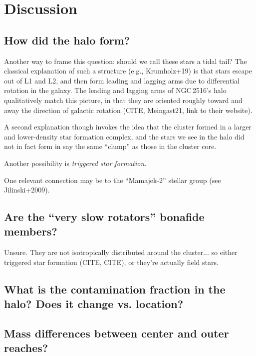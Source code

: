 \documentclass[12pt,twocolumn,tighten]{aastex63}
\begin{document}
\section{Discussion}
\label{sec:discussion}

\subsection{How did the halo form?}
Another way to frame this question: should we call these stars a tidal
tail?
The classical explanation of such a structure (e.g., Krumholz+19) is
that stars escape out of L1 and L2, and then form leading and lagging
arms due to differential rotation in the galaxy.
The leading and lagging arms of NGC\,2516's halo qualitatively
match this picture, in that they are oriented roughly toward and away
the direction of galactic rotation (CITE, Meingast21, link to their
website).

A second explanation though invokes
the idea that the cluster formed in a larger and lower-density star
formation complex, and the stars we see in the halo did not in fact
form in say the same ``clump'' as those in the cluster core.

Another possibility is {\it triggered star formation}.

One relevant connection may be to the ``Mamajek-2'' stellar group
(see Jilinski+2009).



\subsection{Are the ``very slow rotators'' bonafide members?}
Unsure. They are not isotropically distributed around the
cluster... so either triggered star formation (CITE, CITE), or they're
actually field stars.

\subsection{What is the contamination fraction in the halo? Does it change vs. location?}

\subsection{Mass differences between center and outer reaches?}
\end{document}
